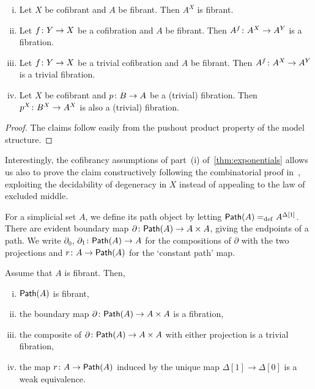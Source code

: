 \documentclass[reqno,10pt,a4paper,oneside,draft]{amsart}
\begin{document}
\begin{lemma} \hfill 
 \label{thm:exponentials}
\begin{enumerate}[(i)] 
\item Let $X$ be cofibrant and $A$ be fibrant.  Then $A^X$ is fibrant.
\item Let $f \colon Y \rightarrow X$ be a cofibration and $A$ be fibrant. Then $A^f \colon A^X \rightarrow A^Y$ is a fibration.
\item Let $f \colon Y \rightarrow X$ be a trivial cofibration and $A$ be fibrant.  Then $A^f \colon A^X \rightarrow A^Y$ is a trivial fibration.
\item Let $X$ be cofibrant and $p \colon B \rightarrow A$ be a (trivial) fibration. Then $p^X \colon B^X \rightarrow A^X$ is also a (trivial) fibration.
\end{enumerate}
\end{lemma}

\begin{proof} The claims follow easily from the pushout product property of the model structure.
\end{proof}
 
Interestingly, the cofibrancy assumptions of part~(i) of~\cref{thm:exponentials} allows
us also to prove the claim constructively following the combinatorial proof in~\cite{MayJP:simoat}, exploiting the decidability of degeneracy in $X$ instead of appealing to the law of excluded middle.




For a simplicial set $A$, we define its path object by letting $\mathsf{Path}(A) =_{\operatorname{def}} A^{\Delta[1]}$. 
There are evident boundary map $\partial \colon \mathsf{Path}(A) \to A \times A$, giving
the endpoints of a path. We write $\partial_0$, $\partial_1 \colon \mathsf{Path}(A) \to A$ for the compositions of $\partial$
with the two projections and $r \colon A \to \mathsf{Path}(A)$ for the `constant path' map.



\begin{proposition} \label{thm:id-types-for-types}
Assume that $A$ is fibrant. Then,
\begin{enumerate}[(i)] 
\item $\mathsf{Path}(A)$ is fibrant,
\item the boundary map $\partial  \colon \mathsf{Path}(A) \rightarrow A \times A$ is a fibration,
\item the composite of $\partial \colon \mathsf{Path}(A) \rightarrow A \times A$ with either projection is a trivial fibration,
\item the map $r \colon A \rightarrow \mathsf{Path}(A)$ induced by the unique map $\Delta[1] \rightarrow \Delta[0]$ is a weak equivalence.
\end{enumerate}
\end{proposition} 
\end{document}

